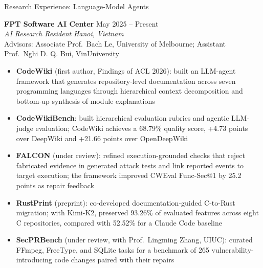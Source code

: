 \documentclass{resume}
\begin{document}
\newpage
\vspace*{0.8em}

\begin{rSection}{Research Experience: Language-Model Agents}

\textbf{FPT Software AI Center} \hfill May 2025 -- Present\\
\textit{AI Research Resident} \hfill \textit{Hanoi, Vietnam}\\
Advisors: Associate Prof.\ Bach Le, University of Melbourne;
Assistant Prof.\ Nghi D. Q. Bui, VinUniversity

\begin{itemize}[leftmargin=1.5em,itemsep=0em,topsep=0.1em]
    \item \textbf{CodeWiki} (first author, Findings of ACL 2026): built an LLM-agent
    framework that generates repository-level documentation across seven
    programming languages through hierarchical context decomposition and
    bottom-up synthesis of module explanations
    \item \textbf{CodeWikiBench}: built hierarchical evaluation rubrics and
    agentic LLM-judge evaluation; CodeWiki achieves a 68.79\% quality score,
    +4.73 points over DeepWiki and +21.66 points over OpenDeepWiki
    \item \textbf{FALCON} (under review): refined execution-grounded checks that
    reject fabricated evidence in generated attack tests and link reported events
    to target execution; the framework improved CWEval Func-Sec@1 by 25.2 points
    as repair feedback
    \item \textbf{RustPrint} (preprint): co-developed documentation-guided C-to-Rust
    migration; with Kimi-K2, preserved 93.26\% of evaluated features across eight
    C repositories, compared with 52.52\% for a Claude Code baseline
    \item \textbf{SecPRBench} (under review, with Prof.\ Lingming Zhang, UIUC):
    curated FFmpeg, FreeType, and SQLite tasks for a benchmark of 265
    vulnerability-introducing code changes paired with their repairs
\end{itemize}

\end{rSection}
\end{document}
